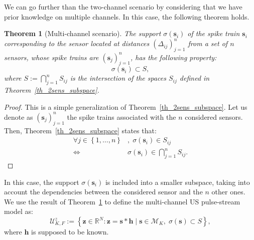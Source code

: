 \documentclass[journal]{IEEEtran}
\newtheorem{theorem}{Theorem}
\newcommand{\vect}[1]{\bm{#1}}
\theoremstyle{definition}
\begin{document}
We can go further than the two-channel scenario by considering that we have prior knowledge on multiple channels. In this case, the following theorem holds.
\begin{theorem}[Multi-channel scenario]
	\label{th_multisens_subspace}
	 The support $\sigma \left(\vect{s}_i\right)$ of the spike train $\vect{s}_i$ corresponding to the sensor located at distances $\left(\Delta_{ij}\right)_{j=1}^n$ from a set of $n$ sensors, whose spike trains are $\left(\vect{s}_j\right)_{j=1}^n$, has the following property:
	\begin{equation*}
	\sigma \left(\vect{s}_i\right) \subset S,
	\end{equation*}
	where $S := \bigcap \limits_{j=1}^{n} S_{ij} $ is the intersection of the spaces $S_{ij}$ defined in Theorem~\ref{th_2sens_subspace}.
\end{theorem}
\begin{proof}
	This is a simple generalization of Theorem~\ref{th_2sens_subspace}. Let us denote as $\left(\vect{s}_j\right)_{j=1}^n$ the spike trains associated with the $n$ considered sensors.
	Then, Theorem~\ref{th_2sens_subspace} states that:
	\begin{align*}
	 \forall j \in \left\lbrace 1,\dots,n \right \rbrace &, \; \sigma \left(\vect{s}_i\right) \in S_{ij} \\
	 \Leftrightarrow & \sigma \left(\vect{s}_i\right) \in \bigcap \limits_{j=1}^{n} S_{ij}. 
	\end{align*} 
\end{proof}

In this case, the support $\sigma\left(\vect{s}_i\right)$ is included into a smaller subspace, taking into account the dependencies between the considered sensor and the $n$ other ones. We use the result of Theorem~\ref{th_multisens_subspace} to define the multi-channel US pulse-stream model as:
\begin{equation}
\label{eq_pulse_USstream_model}
\mathcal{U}^z_{K,F}:=\left\lbrace \vect{z} \in \mathbb{R}^N: \vect{z} = \vect{s} \ast \vect{h} \; | \;\vect{s} \in \mathcal{M}_K, \; \sigma\left(\vect{s}\right) \subset S \right\rbrace,
\end{equation} 
where $\vect{h}$ is supposed to be known. 
\end{document}
